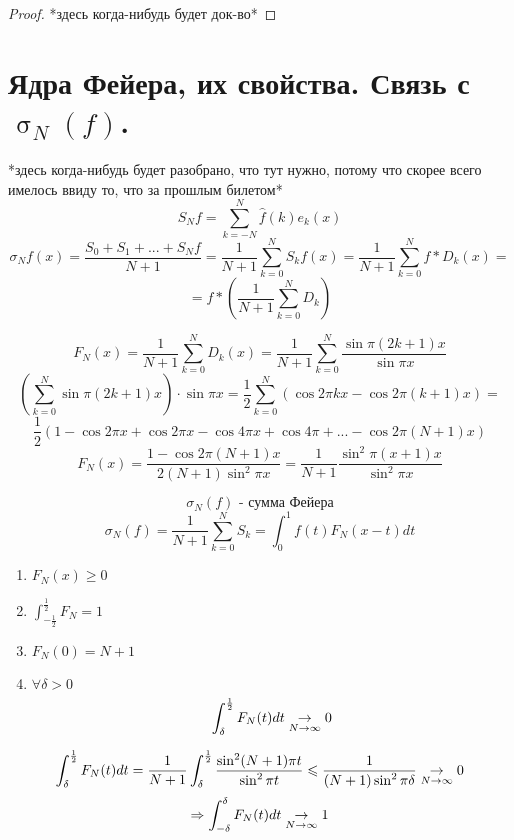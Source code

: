 \documentclass[matan]{subfiles}
\begin{document}
  \begin{proof}
    *здесь когда-нибудь будет док-во*
  \end{proof}

  \newpage
  \section{Ядра Фейера, их свойства. Связь с $\upsigma_N(f)$.}
  *здесь когда-нибудь будет разобрано, что тут нужно, потому что скорее всего имелось ввиду то, что за прошлым билетом*
  \[S_N f = \sum_{k = -N}^N \hat{f}(k)e_k(x) \]
  \[\sigma_N f(x) = \frac{S_0 + S_1 + ... + S_N f}{N + 1} = \frac{1}{N + 1}
  \sum_{k = 0}^N S_k f(x) = \frac{1}{N + 1} \sum_{k = 0}^N f * D_k(x) = \]
  \[= f * (\frac{1}{N  + 1}\sum_{k = 0}^N D_k)\]

  \begin{Definition} 
      \[F_N(x) = \frac{1}{N  + 1} \sum_{k = 0}^N D_k (x) = \frac{1}{N + 1}
      \sum_{k = 0}^N \frac{\sin \pi (2k + 1)x}{\sin \pi x} \]
      \[(\sum_{k = 0}^N \sin \pi (2k + 1)x) \cdot \sin \pi x = \frac{1}{2}
      \sum_{k = 0}^N (\cos 2\pi kx - \cos 2\pi (k + 1)x) =  \]
      \[\frac{1}{2} ( 1 - \cos 2\pi x + \cos 2\pi x - \cos 4\pi x + \cos 4 \pi + ... -
      \cos 2\pi (N + 1)x)\]
      \[F_N(x) = \frac{1 - \cos 2\pi(N + 1)x}{2(N + 1)\sin^2 \pi x} =
      \frac{1}{N + 1} \frac{\sin^2 \pi (x + 1)x}{\sin^2 \pi x}\]
  \end{Definition}

  \[\sigma_N(f) \text{ - сумма Фейера}\]
  \[\sigma_N(f) = \frac{1}{N + 1} \sum_{k = 0}^N S_k = \int_0^1 f(t) F_{N} (x-t)dt\]

  \begin{properties}
    \begin{enumerate}
      \item $F_N (x) \geq 0$
      \item $\int_{-\frac{1}{2}}^{\frac{1}{2}} F_N = 1$
      \item $F_N(0) = N + 1$
      \item $\forall \delta > 0$
      \[\int_{\delta}^{\frac{1}{2}} F_N(t) dt \underset{N \rightarrow \infty}{\rightarrow} 0\]
    \end{enumerate}
  \end{properties}

  \begin{Proof}
    \[\int_{\delta}^{\frac{1}{2}} F_N(t) dt = \frac{1}{N + 1} \int_{\delta}^{\frac{1}{2}} \frac{\sin^2 (N+1) \pi t}{\sin^2 \pi t} \leqslant \frac{1}{(N+1) \sin^2 \pi \delta} \underset{N \rightarrow \infty}{\rightarrow} 0\]
    \[\Rightarrow \int_{-\delta}^{\delta} F_N (t) dt \underset{N \rightarrow \infty}{\rightarrow} 1\]
  \end{Proof}
\end{document}
